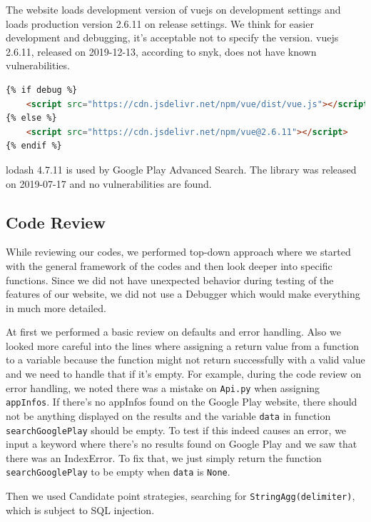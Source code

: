 \documentclass[12pt, a4paper]{article}
\newcommand{\code}[1]{\texttt{#1}}
\begin{document}
The website loads development version of vuejs on development settings and loads production  version 2.6.11 on release settings. We think for easier development and debugging, it's acceptable not to specify the version. vuejs 2.6.11, released on 2019-12-13, according to snyk, does not have known vulnerabilities.

\begin{lstlisting}[language=html, frame=tb, caption=Switching between vuejs development and production version, label=lst:load-vuejs]
{% if debug %}
	<script src="https://cdn.jsdelivr.net/npm/vue/dist/vue.js"></script>
{% else %}
	<script src="https://cdn.jsdelivr.net/npm/vue@2.6.11"></script>
{% endif %}
\end{lstlisting}

lodash 4.7.11 is used by Google Play Advanced Search. The library was released on 2019-07-17 and no vulnerabilities are found.

\subsection{Code Review}

While reviewing our codes, we performed top-down approach where we started with the general framework of the codes and then look deeper into specific functions. Since we did not have unexpected behavior during testing of the features of our website, we did not use a Debugger which would make everything in much more detailed.

At first we performed a basic review on defaults and error handling. Also we looked more careful into the lines where assigning a return value from a function to a variable because the function might not return successfully with a valid value and we need to handle that if it's empty. For example, during the code review on error handling, we noted there was a mistake on \code{Api.py} when assigning \code{appInfos}. If there's no appInfos found on the Google Play website, there should not be anything displayed on the results and the variable \code{data} in function \code{searchGooglePlay} should be empty. To test if this indeed causes an error, we input a keyword where there's no results found on Google Play and we saw that there was an IndexError. To fix that, we just simply return the function \code{searchGooglePlay} to be empty when \code{data} is \code{None}.  

Then we used Candidate point strategies, searching for \code{StringAgg(delimiter)}, which is subject to SQL injection.
\end{document}
